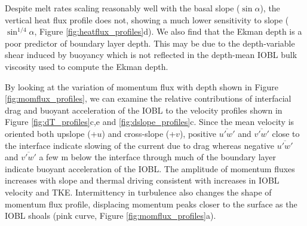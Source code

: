 \documentclass[draft]{agujournal2019}
\begin{document}
Despite melt rates scaling reasonably well with the basal slope ($\sin \alpha$), the vertical heat flux profile does not, showing a much lower sensitivity to slope ($\sin^{1/4}\alpha$, Figure \ref{fig:heatflux_profiles}d). We also find that the Ekman depth is a poor predictor of boundary layer depth. This may be due to the depth-variable shear induced by buoyancy which is not reflected in the depth-mean IOBL bulk viscosity used to compute the Ekman depth. 

By looking at the variation of momentum flux with depth shown in Figure \ref{fig:momflux_profiles}, we can examine the relative contributions of interfacial drag and buoyant acceleration of the IOBL to the velocity profiles shown in Figure \ref{fig:dT_profiles}c,e and \ref{fig:dslope_profiles}c. Since the mean velocity is oriented both upslope (+$u$) and cross-slope (+$v$), positive $\overline{u'w'}$ and $\overline{v'w'}$ close to the interface indicate slowing of the current due to drag whereas negative $\overline{u'w'}$ and $\overline{v'w'}$ a few m below the interface through much of the boundary layer indicate buoyant acceleration of the IOBL. The amplitude of momentum fluxes increases with slope and thermal driving consistent with increases in IOBL velocity and TKE. Intermittency in turbulence also changes the shape of momentum flux profile, displacing momentum peaks closer to the surface as the IOBL shoals (pink curve, Figure \ref{fig:momflux_profiles}a). 
\end{document}
